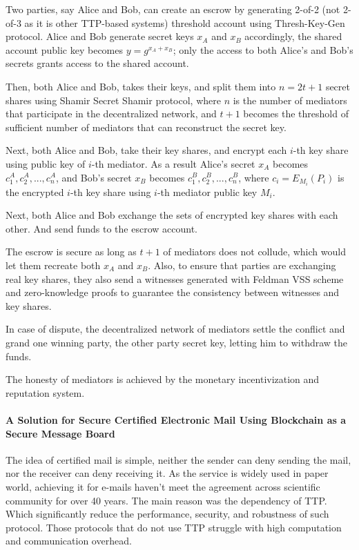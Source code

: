 \documentclass{article}
\begin{document}
Two parties, say Alice and Bob, can create an escrow by generating 2-of-2 (not 2-of-3 as it is other TTP-based systems) threshold account using Thresh-Key-Gen protocol. Alice and Bob generate secret keys $x_A$ and $x_B$ accordingly, the shared account public key becomes $y = g^{x_A+x_B}$; only the access to both Alice's and Bob's secrets grants access to the shared account.

Then, both Alice and Bob, takes their keys, and split them into $n=2t+1$ secret shares using Shamir Secret Shamir protocol, where $n$ is the number of mediators that participate in the decentralized network, and $t+1$ becomes the threshold of sufficient number of mediators that can reconstruct the secret key. 

Next, both Alice and Bob, take their key shares, and encrypt each $i$-th key share using public key of $i$-th mediator. As a result Alice's secret $x_A$ becomes ${c^A_1, c^A_2,...,c^A_n}$, and Bob's secret $x_B$ becomes ${c^B_1, c^B_2,...,c^B_n}$, where $c_i = E_{M_i}(P_i)$ is the encrypted $i$-th key share using $i$-th mediator public key $M_i$. 

Next, both Alice and Bob exchange the sets of encrypted key shares with each other. And send funds to the escrow account. 

The escrow is secure as long as $t+1$ of mediators does not collude, which would let them recreate both $x_A$ and $x_B$. Also, to ensure that parties are exchanging real key shares, they also send a witnesses generated with Feldman VSS scheme and zero-knowledge proofs to guarantee the consistency between witnesses and key shares.

In case of dispute, the decentralized network of mediators settle the conflict and grand one winning party, the other party secret key, letting him to withdraw the funds.

The honesty of mediators is achieved by the monetary incentivization and reputation system.

\paragraph{A Solution for Secure Certified Electronic Mail Using Blockchain as a Secure Message Board}

The idea of certified mail is simple, neither the sender can deny sending the mail, nor the receiver can deny receiving it. As the service is widely used in paper world, achieving it for e-mails haven't meet the agreement across scientific community for over 40 years. The main reason was the dependency of TTP. Which significantly reduce the performance, security, and robustness of such protocol. Those protocols that do not use TTP struggle with high computation and communication overhead.
\end{document}
